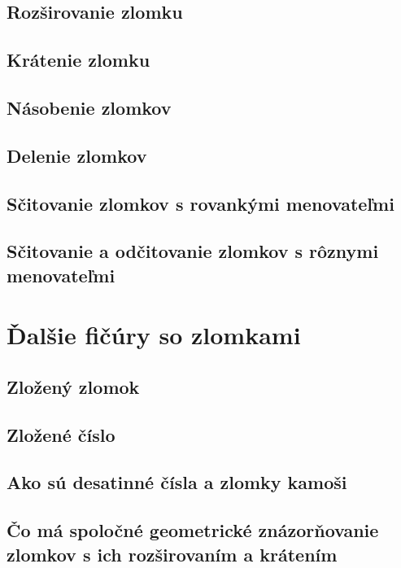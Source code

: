 \documentclass[12pt, twopage]{article}
\theoremstyle{definition}
\begin{document}
	\subsection{Rozširovanie zlomku}
	
	\subsection{Krátenie zlomku}
	
	\subsection{Násobenie zlomkov}
	
	\subsection{Delenie zlomkov}
	
	\subsection{Sčitovanie zlomkov s rovankými menovateľmi}
	
	\subsection{Sčitovanie a odčitovanie zlomkov s rôznymi menovateľmi}
	
	\newpage
	\section{Ďalšie fičúry so zlomkami}
	
	\subsection{Zložený zlomok}
	
	\subsection{Zložené číslo}
	
	\subsection{Ako sú desatinné čísla a zlomky kamoši}
	
	\subsection{Čo má spoločné geometrické znázorňovanie zlomkov s ich rozširovaním a krátením}
	
	
\end{document}
